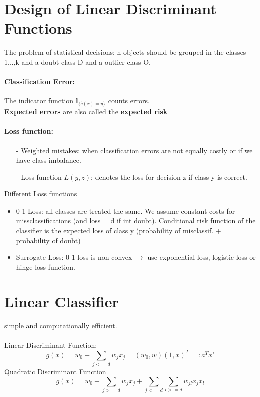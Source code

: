 \section{Design of Linear Discriminant Functions}
The problem of statistical decisions: n objects should be grouped in the classes 1,..,k and a doubt class D and a outlier class O.

\paragraph{Classification Error:}
The indicator function $\mathbb{I}_{\{\hat{c}(x)\!= y\}}$ counts errors.\\
\textbf{Expected errors} are also called the \textbf{expected risk}

\paragraph{Loss function:}
\begin{itemize}
    \item[-]Weighted mistakes: when classification errors are not equally costly or if we have class imbalance.
    \item[-]Loss function $L(y,z)$: denotes the loss for decision z if class y is correct.
\end{itemize}

Different Loss functions
\begin{itemize}
    \item 0-1 Loss: all classes are treated the same. We assume constant costs for missclassifications (and loss = d if int doubt). Conditional risk function of the classifier is the expected loss of class y (probability of misclassif. + probability of doubt)
    
    \item Surrogate Loss: 0-1 loss is non-convex $\rightarrow$ use exponential loss, logistic loss or hinge loss function.
    
\end{itemize}

\section{Linear Classifier}
simple and computationally efficient.\\
\\
Linear Discriminant Function:
\begin{equation}
    g(x) = w_0 + \sum_{j<=d}w_jx_j = (w_0,w)(1,x)^T =: a^Tx'
\end{equation}
Quadratic Discriminant Function 
\begin{equation}
    g(x) = w_0 + \sum_{j>=d}w_jx_j + \sum_{j<=d}\sum_{l>=d}w_{jl}x_jx_l
\end{equation}

